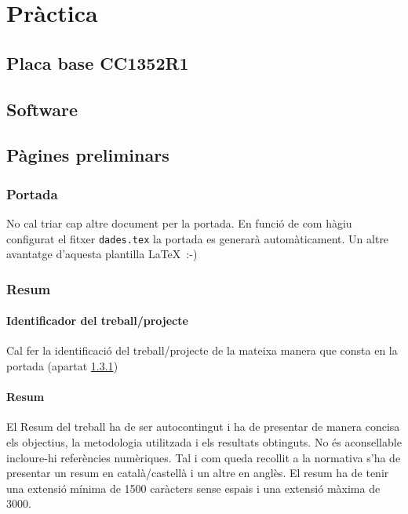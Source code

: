\chapter{Pràctica}

\section{Placa base CC1352R1}

\section{Software}

\section{Pàgines preliminars}

\subsection{Portada}\label{S:portada}

No cal triar cap altre document per la portada. En funció de com hàgiu configurat el fitxer \texttt{dades.tex} la portada es generarà automàticament. Un altre avantatge d'aquesta plantilla \LaTeX \ :-)

\subsection{Resum}

\subsubsection{Identificador del treball/projecte}

Cal fer la identificació del treball/projecte de la mateixa manera que consta en la portada (apartat \ref{S:portada})

\subsubsection{Resum}

El Resum del treball ha de ser autocontingut i ha de presentar de manera concisa els objectius, la metodologia utilitzada i els resultats obtinguts. No és aconsellable incloure-hi referències numèriques. Tal i com queda recollit a la normativa s'ha de presentar un resum en català/castellà i un altre en anglès. El resum ha de tenir una extensió mínima de 1500 caràcters sense espais i una extensió màxima de 3000.



